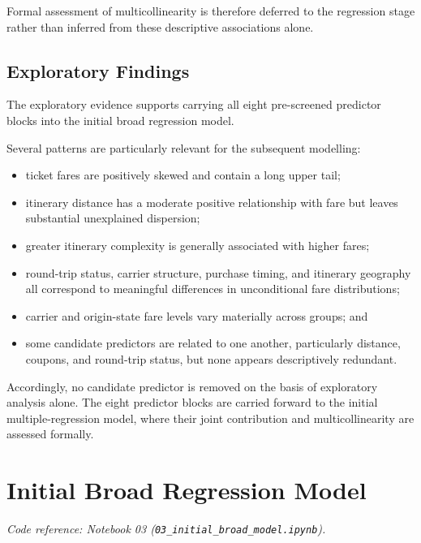 \documentclass[11pt,a4paper]{article}
\begin{document}
Formal assessment of multicollinearity is therefore deferred to the regression stage rather than inferred from these descriptive associations alone.

\subsection{Exploratory Findings}

The exploratory evidence supports carrying all eight pre-screened predictor blocks into the initial broad regression model.

Several patterns are particularly relevant for the subsequent modelling:

\begin{itemize}
    \item ticket fares are positively skewed and contain a long upper tail;
    \item itinerary distance has a moderate positive relationship with fare but leaves substantial unexplained dispersion;
    \item greater itinerary complexity is generally associated with higher fares;
    \item round-trip status, carrier structure, purchase timing, and itinerary geography all correspond to meaningful differences in unconditional fare distributions;
    \item carrier and origin-state fare levels vary materially across groups; and
    \item some candidate predictors are related to one another, particularly distance, coupons, and round-trip status, but none appears descriptively redundant.
\end{itemize}

Accordingly, no candidate predictor is removed on the basis of exploratory analysis alone. The eight predictor blocks are carried forward to the initial multiple-regression model, where their joint contribution and multicollinearity are assessed formally.


\section{Initial Broad Regression Model}

\noindent\textit{Code reference: Notebook 03 (\texttt{03\_initial\_broad\_model.ipynb}).}
\end{document}
